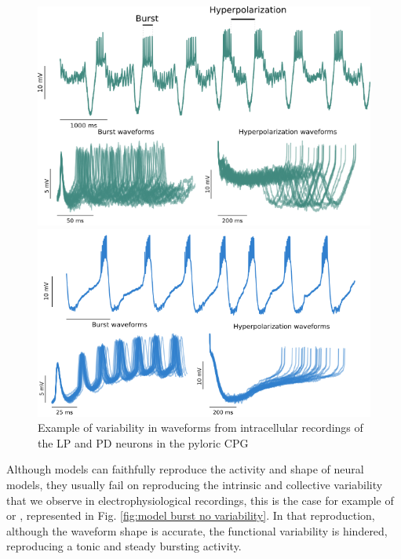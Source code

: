 \begin{figure}[hbt]
	\centering
	\begin{minipage}{0.48\textwidth}
		\includegraphics[width=\textwidth]{img/invariants/variability/lp_burst_variability.png}
	\end{minipage}
	\begin{minipage}{0.48\textwidth}
		\includegraphics[width=\textwidth]{img/invariants/variability/pd_burst_variability.png}
	\end{minipage}
	\caption{Example of variability in waveforms from intracellular recordings of the LP and PD neurons in the pyloric CPG}
	\label{fig:lp-pd burst variability}
\end{figure}

Although models can faithfully reproduce the activity and shape of neural models, they usually fail on reproducing the intrinsic and collective variability that we observe in electrophysiological recordings, this is the case for example of \cite{hodgkin_quantitative_1952} or \cite{vavoulis_dynamic_2007}, represented in Fig. \ref{fig:model burst no variability}. In that reproduction, although the waveform shape is accurate, the functional variability is hindered, reproducing a tonic and steady bursting activity. 

